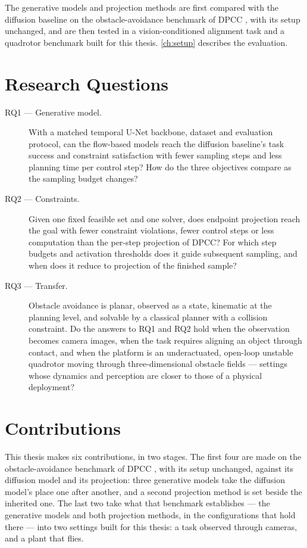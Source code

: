 The generative models and projection methods are first compared with the diffusion baseline on the
obstacle-avoidance benchmark of \ac{DPCC} \parencite{romer2025diffusion,jia2024towards}, with its
setup unchanged, and are then tested in a vision-conditioned alignment task and a quadrotor benchmark
built for this thesis. \autoref{ch:setup} describes the evaluation.

\section{Research Questions}\label{sec:intro:rqs}

\begin{description}
  \item[RQ1 --- Generative model.] With a matched temporal U-Net backbone, dataset and evaluation
    protocol, can the flow-based models reach the diffusion baseline's task success and constraint
    satisfaction with fewer sampling steps and less planning time per control step? How do the three
    objectives compare as the sampling budget changes?
  \item[RQ2 --- Constraints.] Given one fixed feasible set and one solver, does endpoint projection
    reach the goal with fewer constraint violations, fewer control steps or less computation than
    the per-step projection of \ac{DPCC}? For which step budgets and activation thresholds does it
    guide subsequent sampling, and when does it reduce to projection of the finished sample?
  \item[RQ3 --- Transfer.] Obstacle avoidance is planar, observed as a state, kinematic at the
    planning level, and solvable by a classical planner with a collision constraint. Do the answers
    to RQ1 and RQ2 hold when the observation becomes camera images, when the task requires aligning
    an object through contact, and when the platform is an underactuated, open-loop unstable
    quadrotor moving through three-dimensional obstacle fields --- settings whose dynamics and
    perception are closer to those of a physical deployment?
\end{description}

\section{Contributions}\label{sec:intro:contributions}

This thesis makes six contributions, in two stages. The first four are made on the obstacle-avoidance
benchmark of \ac{DPCC} \parencite{romer2025diffusion,jia2024towards}, with its setup unchanged, against
its diffusion model and its projection: three generative models take the diffusion model's place one
after another, and a second projection method is set beside the inherited one. The last two take what
that benchmark establishes --- the generative models and both projection methods, in the
configurations that hold there --- into two settings built for this thesis: a task observed through
cameras, and a plant that flies.

